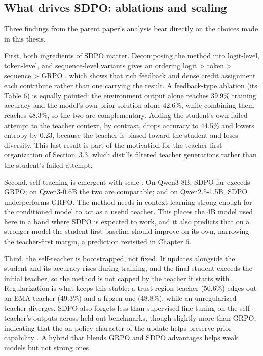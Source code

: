 \documentclass[12pt,a4paper]{report}
\begin{document}
\subsection{What drives SDPO: ablations and scaling}\label{what-drives-sdpo-ablations-and-scaling}

Three findings from the parent paper's analysis bear directly on the choices made in this thesis.

First, both ingredients of SDPO matter. Decomposing the method into logit-level, token-level, and sequence-level variants gives an ordering logit \textgreater{} token \textgreater{} sequence \textgreater{} GRPO \cite{r1}, which shows that rich feedback and dense credit assignment each contribute rather than one carrying the result. A feedback-type ablation (its Table 6) is equally pointed: the environment output alone reaches 39.9\% training accuracy and the model's own prior solution alone 42.6\%, while combining them reaches 48.3\%, so the two are complementary. Adding the student's own failed attempt to the teacher context, by contrast, drops accuracy to 44.5\% and lowers entropy by 0.23, because the teacher is biased toward the student and loses diversity. This last result is part of the motivation for the teacher-first organization of Section~3.3, which distills filtered teacher generations rather than the student's failed attempt.

Second, self-teaching is emergent with scale \cite{r1}. On Qwen3-8B, SDPO far exceeds GRPO; on Qwen3-0.6B the two are comparable; and on Qwen2.5-1.5B, SDPO underperforms GRPO. The method needs in-context learning strong enough for the conditioned model to act as a useful teacher. This places the 4B model used here in a band where SDPO is expected to work, and it also predicts that on a stronger model the student-first baseline should improve on its own, narrowing the teacher-first margin, a prediction revisited in Chapter 6.

Third, the self-teacher is bootstrapped, not fixed. It updates alongside the student and its accuracy rises during training, and the final student exceeds the initial teacher, so the method is not capped by the teacher it starts with \cite{r1}. Regularization is what keeps this stable: a trust-region teacher (50.6\%) edges out an EMA teacher (49.3\%) and a frozen one (48.8\%), while an unregularized teacher diverges. SDPO also forgets less than supervised fine-tuning on the self-teacher's outputs across held-out benchmarks, though slightly more than GRPO, indicating that the on-policy character of the update helps preserve prior capability \cite{r1}. A hybrid that blends GRPO and SDPO advantages helps weak models but not strong ones \cite{r1}.
\end{document}
